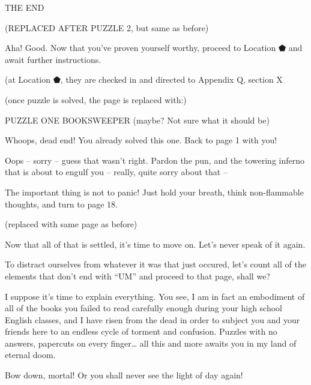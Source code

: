 \documentclass[14pt]{extbook}
\begin{document}
\begin{center}
  THE END
\end{center}

(REPLACED AFTER PUZZLE 2, but same as before)
\vspace*{\fill}
\newpage

\vspace*{\fill} %
Aha! Good. Now that you've proven yourself worthy, proceed to Location ⬟ and await further instructions.

(at Location ⬟, they are checked in and directed to Appendix Q, section X

(once puzzle is solved, the page is replaced with:)

PUZZLE ONE
BOOKSWEEPER (maybe? Not sure what it should be)

Whoops, dead end! You already solved this one. Back to page 1 with you!
\vspace*{\fill}
\newpage

\vspace*{\fill} %
Oops -- sorry -- guess that wasn't right. Pardon the pun, and the towering inferno that is about to engulf you -- really, quite sorry about that --

The important thing is not to panic! Just hold your breath, think non-flammable thoughts, and turn to page 18.

(replaced with same page as before)
\vspace*{\fill}
\newpage

\vspace*{\fill} %
Now that all of that is settled, it's time to move on. Let's never speak of it again.

To distract ourselves from whatever it was that just occured, let's count all of the elements that don't end with ``UM'' and proceed to that page, shall we?
\vspace*{\fill}
\newpage

\vspace*{\fill} %
I suppose it’s time to explain everything. You see, I am in fact an embodiment of all of the books you failed to read carefully enough during your high school English classes, and I have risen from the dead in order to subject you and your friends here to an endless cycle of torment and confusion. Puzzles with no answers, papercuts on every finger… all this and more awaits you in my land of eternal doom.

Bow down, mortal! Or you shall never see the light of day again!
\end{document}
